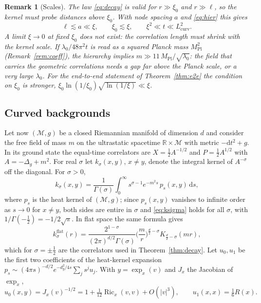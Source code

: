 \documentclass[11pt,a4paper]{article}
\theoremstyle{stmt}
\theoremstyle{defn}
\theoremstyle{rmk}
\newtheorem{remark}[theorem]{Remark}
\numberwithin{equation}{section}
\DeclareMathOperator{\Ric}{Ric}
\newcommand{\M}{\mathcal{M}}
\newcommand{\R}{\mathbb{R}}
\newcommand{\dd}{\mathrm{d}}
\newcommand{\Lcurv}{L_{\mathrm{curv}}}
\begin{document}
\begin{remark}[Scales]\label{rem:scales}
The law \eqref{eq:decay} is valid for $r\gg\xi_0$ and $r\gg\ell$, so the kernel must probe distances above $\xi_0$. With node spacing $a$ and \eqref{eq:hier} this gives
\begin{equation}
\ell\lesssim a\ll\xi,\qquad \xi_0\lesssim\xi,\qquad \xi^2\ll t\ll\Lcurv^2 .
\end{equation}
A limit $\xi\to0$ at fixed $\xi_0$ does not exist: the correlation length must shrink with the kernel scale. If $\lambda_0/48\pi^2t$ is read as a squared Planck mass $M_{\mathrm{Pl}}^2$ (Remark~\ref{rem:coeff}), the hierarchy implies $m\gg11\,M_{\mathrm{Pl}}/\sqrt{\lambda_0}$: the field that carries the geometric correlations needs a gap far above the Planck scale, or a very large $\lambda_0$. For the end-to-end statement of Theorem~\ref{thm:e2e} the condition on $\xi_0$ is stronger, $\xi_0\ln(1/\xi_0)\sqrt{\ln(1/\xi)}\ll\xi$.
\end{remark}

\subsection{Curved backgrounds}\label{sec:curved}

Let now $(\M,g)$ be a closed Riemannian manifold of dimension $d$ and consider the free field of mass $m$ on the ultrastatic spacetime $\R\times\M$ with metric $-\dd t^2+g$. In its ground state the equal-time correlators are $X=\tfrac12A^{-1/2}$ and $P=\tfrac12A^{1/2}$ with $A=-\Delta_g+m^2$. For real $\sigma$ let $k_\sigma(x,y)$, $x\ne y$, denote the integral kernel of $A^{-\sigma}$ off the diagonal. For $\sigma>0$,
\begin{equation}\label{eq:ksigma}
k_\sigma(x,y)=\frac{1}{\Gamma(\sigma)}\int_0^\infty s^{\sigma-1}e^{-m^2s}\,p_s(x,y)\,\dd s ,
\end{equation}
where $p_s$ is the heat kernel of $(\M,g)$; since $p_s(x,y)$ vanishes to infinite order as $s\to0$ for $x\ne y$, both sides are entire in $\sigma$ and \eqref{eq:ksigma} holds for all $\sigma$, with $1/\Gamma(-\tfrac12)=-1/2\sqrt\pi$. In flat space the same formula gives
\begin{equation}\label{eq:kflat}
k^{\mathrm{flat}}_\sigma(r)=\frac{2^{1-\sigma}}{(2\pi)^{d/2}\Gamma(\sigma)}\Big(\frac mr\Big)^{\frac d2-\sigma}K_{\frac d2-\sigma}(mr),
\end{equation}
which for $\sigma=\pm\tfrac12$ are the correlators used in Theorem~\ref{thm:decay}. Let $u_0,u_1$ be the first two coefficients of the heat-kernel expansion $p_s\sim(4\pi s)^{-d/2}e^{-d_g^2/4s}\sum_js^ju_j$. With $y=\exp_x(v)$ and $J_x$ the Jacobian of $\exp_x$,
\begin{equation}\label{eq:u0}
u_0(x,y)=J_x(v)^{-1/2}=1+\tfrac1{12}\Ric_x(v,v)+O(|v|^3),\qquad u_1(x,x)=\tfrac16R(x).
\end{equation}
\end{document}
